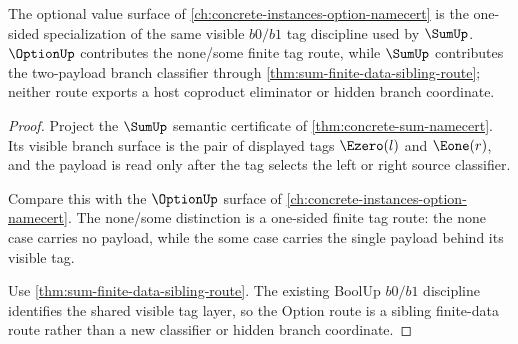 \begin{theorem}
\label{thm:sum-finite-data-option-route}
The optional value surface of \autoref{ch:concrete-instances-option-namecert} is the one-sided specialization of the same visible $b0/b1$ tag discipline used by $\SumUp$. $\OptionUp$ contributes the none/some finite tag route, while $\SumUp$ contributes the two-payload branch classifier through \autoref{thm:sum-finite-data-sibling-route}; neither route exports a host coproduct eliminator or hidden branch coordinate.
\end{theorem}
\begin{proof}
Project the $\SumUp$ semantic certificate of \autoref{thm:concrete-sum-namecert}. Its visible branch surface is the pair of displayed tags $\Ezero(l)$ and $\Eone(r)$, and the payload is read only after the tag selects the left or right source classifier.

Compare this with the $\OptionUp$ surface of \autoref{ch:concrete-instances-option-namecert}. The none/some distinction is a one-sided finite tag route: the none case carries no payload, while the some case carries the single payload behind its visible tag.

Use \autoref{thm:sum-finite-data-sibling-route}. The existing BoolUp $b0/b1$ discipline identifies the shared visible tag layer, so the Option route is a sibling finite-data route rather than a new classifier or hidden branch coordinate.
\end{proof}

